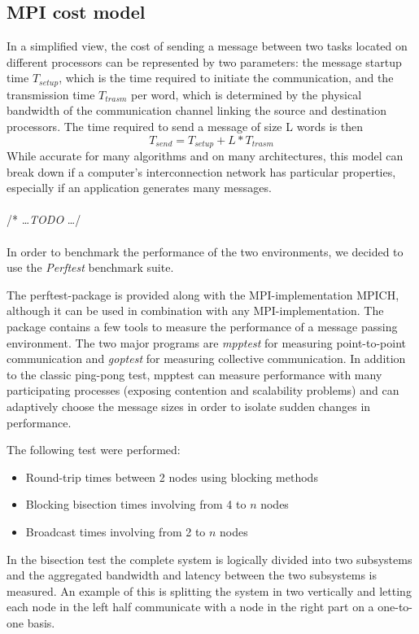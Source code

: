 \subsection{MPI cost model}
In a simplified view, the cost of sending a message between two tasks located on different processors can be represented by two parameters: the message startup time $T_{setup}$, which is the time required to initiate the communication, and the transmission time $T_{trasm}$ per word, which is determined by the physical bandwidth of the communication channel linking the source and destination processors. The time required to send a message of size L words is then
\[
T_{send} = T_{setup} + L * T_{trasm}
\]
While accurate for many algorithms and on many architectures, this model can break down if a computer's interconnection network has particular properties, especially if an application generates many messages.
\\ \\
/* \dots \textit{TODO} \dots */
\\ \\
In order to benchmark the performance of the two environments, we decided to use the \textit{Perftest} benchmark suite.

The perftest-package is provided along with the MPI-implementation MPICH, although it can be used in combination with any MPI-implementation. The package contains a few tools to measure the performance of a message passing environment. The two major programs are \textit{mpptest} for measuring point-to-point communication and \textit{goptest} for measuring collective communication. In addition to the classic ping-pong test, mpptest can measure performance with many participating processes (exposing contention and scalability problems) and can adaptively choose the message sizes in order to isolate sudden changes in performance. 

The following test were performed:
\begin{itemize}
	\item Round-trip times between 2 nodes using blocking methods
	\item Blocking bisection times involving from 4 to $n$ nodes
	\item Broadcast times involving from 2 to $n$ nodes
\end{itemize}
In the bisection test the complete system is logically divided into two subsystems and the aggregated bandwidth and latency between the two subsystems is measured. An example of this is splitting the system in two vertically and letting each node in the left half communicate with a node in the right part on a one-to-one basis.



